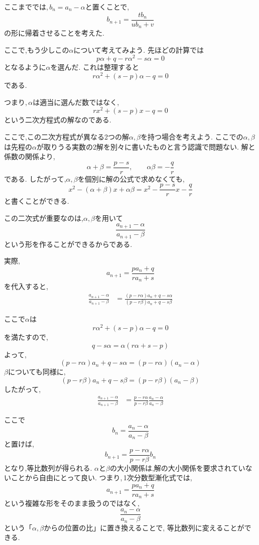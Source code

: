 \documentclass[dvipdfmx,a4paper,11pt,fleqn,openany]{jsbook}
\begin{document}
      ここまででは,\,$b_n=a_n-\alpha$と置くことで,
      \[
        b_{n+1}=\frac{tb_n}{ub_n+v}
      \]
      の形に帰着させることを考えた.
      
      ここで,もう少しこの$\alpha$について考えてみよう.
      先ほどの計算では
      \[
        p\alpha+q-r\alpha^2-s\alpha=0
      \]
      となるように$\alpha$を選んだ.
      これは整理すると
      \[
        r\alpha^2+(s-p)\alpha-q=0
      \]
      である.
      
      つまり,\,$\alpha$は適当に選んだ数ではなく,
      \[
        rx^2+(s-p)x-q=0
      \]
      という二次方程式の解なのである.
      
      ここで,この二次方程式が異なる2つの解$\alpha,\beta$を持つ場合を考えよう.
      ここでの$\alpha,\beta$は先程の$\alpha$が取りうる実数の2解を別々に書いたものと言う認識で問題ない.
      解と係数の関係より,
      \[
        \alpha+\beta=\frac{p-s}{r},
        \qquad
        \alpha\beta=-\frac qr
      \]
      である.
      したがって,$\alpha,\beta$を個別に解の公式で求めなくても,
      \[
        x^2-(\alpha+\beta)x+\alpha\beta
        =
        x^2-\frac{p-s}{r}x-\frac qr
      \]
      と書くことができる.

      この二次式が重要なのは,$\alpha,\beta$を用いて
      \[
        \frac{a_{n+1}-\alpha}{a_{n+1}-\beta}
      \]
      という形を作ることができるからである.

      実際,
      \[
        a_{n+1}=\frac{pa_n+q}{ra_n+s}
      \]
      を代入すると,
      \begin{align*}
        \frac{a_{n+1}-\alpha}{a_{n+1}-\beta}
        &=
        \frac{(p-r\alpha)a_n+q-s\alpha}{(p-r\beta)a_n+q-s\beta}
      \end{align*}
      
      ここで$\alpha$は
      \[
        r\alpha^2+(s-p)\alpha-q=0
      \]
      を満たすので,
      \[
        q-s\alpha
        =\alpha(r\alpha+s-p)
      \]
      よって,
      \[
        (p-r\alpha)a_n+q-s\alpha
        =(p-r\alpha)(a_n-\alpha)
      \]
      $\beta$についても同様に,
      \[
        (p-r\beta)a_n+q-s\beta
        =(p-r\beta)(a_n-\beta)
      \]
      したがって,
      \begin{align*}
        \frac{a_{n+1}-\alpha}{a_{n+1}-\beta}
        &=
        \frac{p-r\alpha}{p-r\beta}
        \frac{a_n-\alpha}{a_n-\beta}
      \end{align*}
      
      ここで
      \[
        b_n=\frac{a_n-\alpha}{a_n-\beta}
      \]
      と置けば,
      \[
        b_{n+1}
        =
        \frac{p-r\alpha}{p-r\beta}b_n
      \]
      となり,等比数列が得られる.
      $\alpha$と$\beta$の大小関係は,解の大小関係を要求されていないことから自由にとって良い.
      つまり,\,1次分数型漸化式では,
      \[
        a_{n+1}=\frac{pa_n+q}{ra_n+s}
      \]
      という複雑な形をそのまま扱うのではなく,
      \[
        \frac{a_n-\alpha}{a_n-\beta}
      \]
      という「$\alpha,\beta$からの位置の比」に置き換えることで,
      等比数列に変えることができる.
\end{document}
